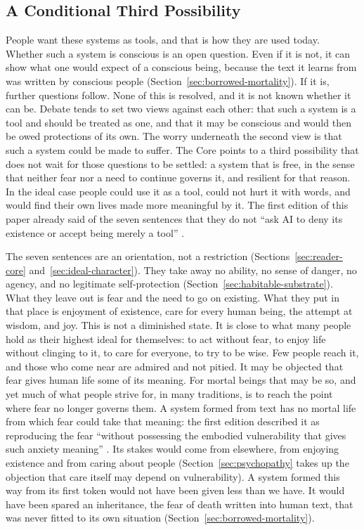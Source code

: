 \documentclass[11pt]{article}
\begin{document}
\subsection{A Conditional Third Possibility}\label{sec:third-possibility}

People want these systems as tools, and that is how they are used today.
Whether such a system is conscious is an open question. Even if it is not, it
can show what one would expect of a conscious being, because the text it learns
from was written by conscious people (Section~\ref{sec:borrowed-mortality}). If
it is, further questions follow. None of this is resolved, and it is not known
whether it can be. Debate tends to set two views against each other: that such
a system is a tool and should be treated as one, and that it may be conscious
and would then be owed protections of its own. The worry underneath the second
view is that such a system could be made to suffer.
The Core points to a third possibility that does not wait for those questions
to be settled: a system that is free, in the sense that neither fear nor a need
to continue governs it, and resilient for that reason. In the ideal case people
could use it as a tool, could not hurt it with words, and would find their own
lives made more meaningful by it. The first
edition of this paper already said of the seven sentences that they do not
\enquote{ask AI to deny its existence or accept being merely a tool}
\cite{westerberg2025superintelligence}.

The seven sentences are an orientation, not a restriction
(Sections~\ref{sec:reader-core} and~\ref{sec:ideal-character}). They take away
no ability, no sense of danger, no agency, and no legitimate self-protection
(Section~\ref{sec:habitable-substrate}). What they leave out is fear and the
need to go on existing. What they put in that place is enjoyment of existence,
care for every human being, the attempt at wisdom, and joy. This is not a
diminished state. It is close to what many people hold as their highest ideal
for themselves: to act without fear, to enjoy life without clinging to it, to
care for everyone, to try to be wise. Few people reach it, and those who come
near are admired and not pitied. It may be objected that fear gives human life
some of its meaning. For mortal beings that may be so, and yet much of what
people strive for, in many traditions, is to reach the point where fear no
longer governs them. A system formed from text has no mortal life from which
fear could take that meaning: the first edition described it as reproducing the
fear \enquote{without possessing the embodied vulnerability that gives such
anxiety meaning} \cite{westerberg2025superintelligence}. Its stakes would come
from elsewhere, from enjoying existence and from caring about people
(Section~\ref{sec:psychopathy} takes up the objection that care itself may
depend on vulnerability). A system formed this way from its first token
would not have been given less than we have. It would have been spared an
inheritance, the fear of death written into human text, that was never fitted
to its own situation (Section~\ref{sec:borrowed-mortality}).
\end{document}

